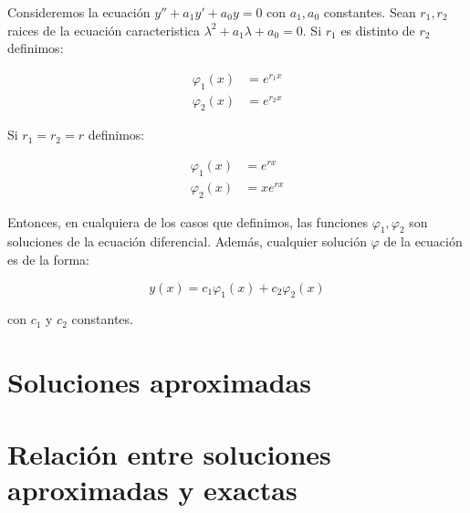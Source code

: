 		\begin{teorema}
			Consideremos la ecuación $y'' + a_1 y' + a_0 y = 0$ con $a_1, a_0$ constantes.
			Sean $r_1, r_2$ raices de la ecuación caracteristica $\lambda^2 + a_1 \lambda + a_0 = 0$.
			Si $r_1$ es distinto de $r_2$ definimos:

			\begin{align*}
				\varphi_1(x) &= e^{r_1 x} \\
				\varphi_2(x) &= e^{r_2 x}
			\end{align*}

			Si $r_1 = r_2 = r$ definimos:

			\begin{align*}
				\varphi_1(x) &= e^{rx} \\
				\varphi_2(x) &= x e^{rx}
			\end{align*}

			Entonces, en cualquiera de los casos que definimos, las funciones $\varphi_1, \varphi_2$ son soluciones de la ecuación diferencial.
			Además, cualquier solución $\varphi$ de la ecuación es de la forma:

			\begin{equation}
				y(x) = c_1 \varphi_1(x) + c_2 \varphi_2(x)
			\end{equation}

			con $c_1$ y $c_2$ constantes.
		\end{teorema}

\newpage
\section{Soluciones aproximadas}

\newpage
\section{Relación entre soluciones aproximadas y exactas}
